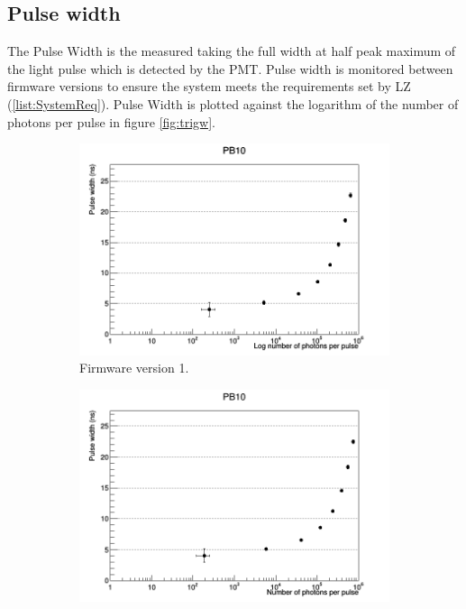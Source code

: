 \subsection{Pulse width}\label{subsec:pulsew}
The Pulse Width is the measured taking the full width at half peak maximum of the light pulse which is detected by the PMT. Pulse width is monitored between firmware versions to ensure the system meets the requirements set by LZ (\ref{list:SystemReq}). Pulse Width is plotted against the logarithm of the number of photons per pulse in figure \ref{fig:trigw}.  
\begin{figure}[ht!]
\centering
    \begin{subfigure}[b]{.475\textwidth}
        \centering
        \includegraphics[width=\textwidth]{Figures/Plots/V1_log(Nph)vsPulseWidthPB10.png}
        \caption{Firmware version 1.}
        \label{fig:pulse1}
    \end{subfigure}
    \hfill
    \begin{subfigure}[b]{.475\textwidth}
        \centering
        \includegraphics[width=\textwidth]{Figures/Plots/V2_log(Nph)vsPulseWidthPB10.png}

\end{subfigure}
\end{figure}
